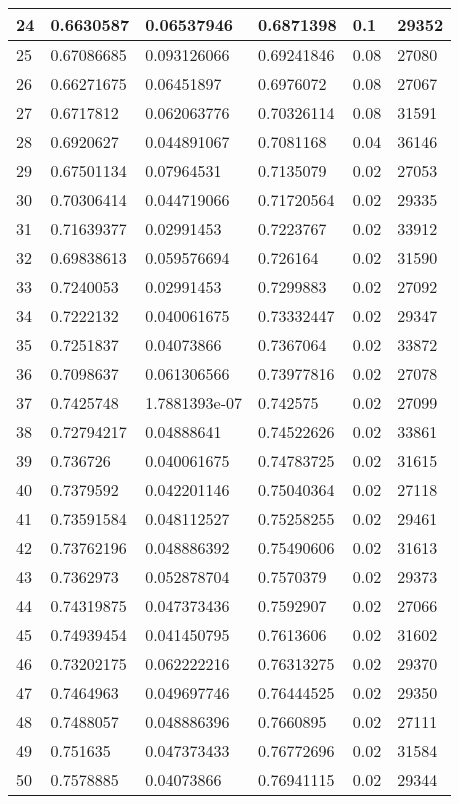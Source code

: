 \begin{longtable}{|l|l|l|l|l|l|}
24 & 0.6630587 & 0.06537946 & 0.6871398 & 0.1 & 29352 \\ \hline 
25 & 0.67086685 & 0.093126066 & 0.69241846 & 0.08 & 27080 \\ \hline 
26 & 0.66271675 & 0.06451897 & 0.6976072 & 0.08 & 27067 \\ \hline 
27 & 0.6717812 & 0.062063776 & 0.70326114 & 0.08 & 31591 \\ \hline 
28 & 0.6920627 & 0.044891067 & 0.7081168 & 0.04 & 36146 \\ \hline 
29 & 0.67501134 & 0.07964531 & 0.7135079 & 0.02 & 27053 \\ \hline 
30 & 0.70306414 & 0.044719066 & 0.71720564 & 0.02 & 29335 \\ \hline 
31 & 0.71639377 & 0.02991453 & 0.7223767 & 0.02 & 33912 \\ \hline 
32 & 0.69838613 & 0.059576694 & 0.726164 & 0.02 & 31590 \\ \hline 
33 & 0.7240053 & 0.02991453 & 0.7299883 & 0.02 & 27092 \\ \hline 
34 & 0.7222132 & 0.040061675 & 0.73332447 & 0.02 & 29347 \\ \hline 
35 & 0.7251837 & 0.04073866 & 0.7367064 & 0.02 & 33872 \\ \hline 
36 & 0.7098637 & 0.061306566 & 0.73977816 & 0.02 & 27078 \\ \hline 
37 & 0.7425748 & 1.7881393e-07 & 0.742575 & 0.02 & 27099 \\ \hline 
38 & 0.72794217 & 0.04888641 & 0.74522626 & 0.02 & 33861 \\ \hline 
39 & 0.736726 & 0.040061675 & 0.74783725 & 0.02 & 31615 \\ \hline 
40 & 0.7379592 & 0.042201146 & 0.75040364 & 0.02 & 27118 \\ \hline 
41 & 0.73591584 & 0.048112527 & 0.75258255 & 0.02 & 29461 \\ \hline 
42 & 0.73762196 & 0.048886392 & 0.75490606 & 0.02 & 31613 \\ \hline 
43 & 0.7362973 & 0.052878704 & 0.7570379 & 0.02 & 29373 \\ \hline 
44 & 0.74319875 & 0.047373436 & 0.7592907 & 0.02 & 27066 \\ \hline 
45 & 0.74939454 & 0.041450795 & 0.7613606 & 0.02 & 31602 \\ \hline 
46 & 0.73202175 & 0.062222216 & 0.76313275 & 0.02 & 29370 \\ \hline 
47 & 0.7464963 & 0.049697746 & 0.76444525 & 0.02 & 29350 \\ \hline 
48 & 0.7488057 & 0.048886396 & 0.7660895 & 0.02 & 27111 \\ \hline 
49 & 0.751635 & 0.047373433 & 0.76772696 & 0.02 & 31584 \\ \hline 
50 & 0.7578885 & 0.04073866 & 0.76941115 & 0.02 & 29344 \\ \hline 
\end{longtable}